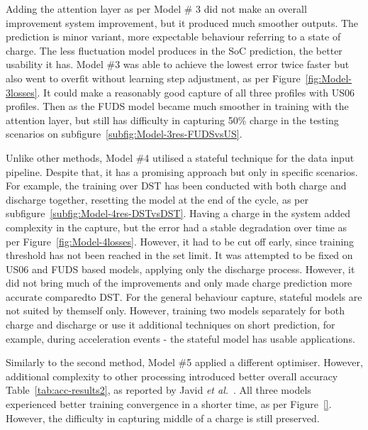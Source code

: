 %
%
Adding the attention layer as per Model \# 3 did not make an overall improvement system improvement, but it produced much smoother outputs.
The prediction is minor variant, more expectable behaviour referring to a state of charge.
The less fluctuation model produces in the SoC prediction, the better usability it has.
Model \#3 was able to achieve the lowest error twice faster but also went to overfit without learning step adjustment, as per Figure~\ref{fig:Model-3losses}.
It could make a reasonably good capture of all three profiles with US06 profiles.
Then as the FUDS model became much smoother in training with the attention layer, but still has difficulty in capturing 50\% charge in the testing scenarios on subfigure~\ref{subfig:Model-3res-FUDSvsUS}. 

%
%
Unlike other methods, Model \#4 utilised a stateful technique for the data input pipeline.
Despite that, it has a promising approach but only in specific scenarios.
For example, the training over DST has been conducted with both charge and discharge together, resetting the model at the end of the cycle, as per subfigure~\ref{subfig:Model-4res-DSTvsDST}.
Having a charge in the system added complexity in the capture, but the error had a stable degradation over time as per Figure~\ref{fig:Model-4losses}.
However, it had to be cut off early, since training threshold has not been reached in the set limit.
It was attempted to be fixed on US06 and FUDS based models, applying only the discharge process.
However, it did not bring much of the improvements and only made charge prediction more accurate comparedto DST.
For the general behaviour capture, stateful models are not suited by themself only.
However, training two models separately for both charge and discharge or use it additional techniques on short prediction, for example, during acceleration events - the stateful model has usable applications.

%
%
Similarly to the second method, Model \#5 applied a different optimiser.
However, additional complexity to other processing introduced better overall accuracy Table~\ref{tab:acc-results2}, as reported by Javid \textit{et al.}~\cite{javid_adaptive_2020}.
All three models experienced better training convergence in a shorter time, as per Figure~\ref{}.
However, the difficulty in capturing middle of a charge is still preserved.


